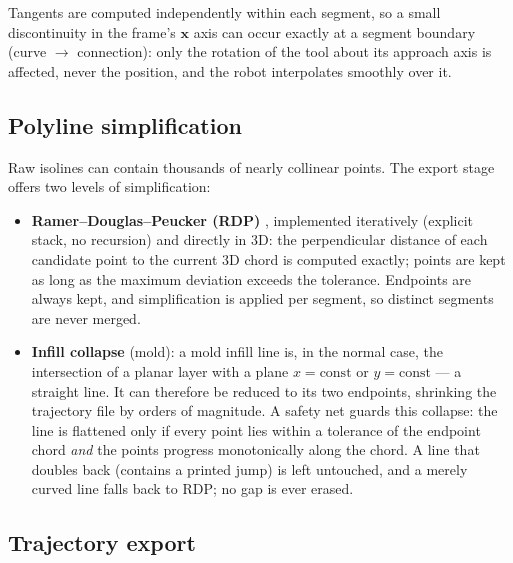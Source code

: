 Tangents are computed independently within each segment, so a small
discontinuity in the frame's $\mathbf{x}$ axis can occur exactly at a
segment boundary (curve $\to$ connection): only the rotation of the
tool about its approach axis is affected, never the position, and the
robot interpolates smoothly over it.

\subsection{Polyline simplification}\label{sec:meth-simplify}

Raw isolines can contain thousands of nearly collinear points. The
export stage offers two levels of simplification:

\begin{itemize}
  \item \textbf{Ramer--Douglas--Peucker (RDP)} \cite{rdp}, implemented
        iteratively (explicit stack, no recursion) and directly in 3D:
        the perpendicular distance of each candidate point to the
        current 3D chord is computed exactly; points are kept as long
        as the maximum deviation exceeds the tolerance. Endpoints are
        always kept, and simplification is applied per segment, so
        distinct segments are never merged.
  \item \textbf{Infill collapse} (mold): a mold infill line is, in the
        normal case, the intersection of a planar layer with a plane
        $x = \text{const}$ or $y = \text{const}$ --- a straight line.
        It can therefore be reduced to its two endpoints, shrinking
        the trajectory file by orders of magnitude. A safety net
        guards this collapse: the line is flattened only if every
        point lies within a tolerance of the endpoint chord \emph{and}
        the points progress monotonically along the chord. A line that
        doubles back (contains a printed jump) is left untouched, and
        a merely curved line falls back to RDP; no gap is ever erased.
\end{itemize}

\subsection{Trajectory export}\label{sec:meth-export}

